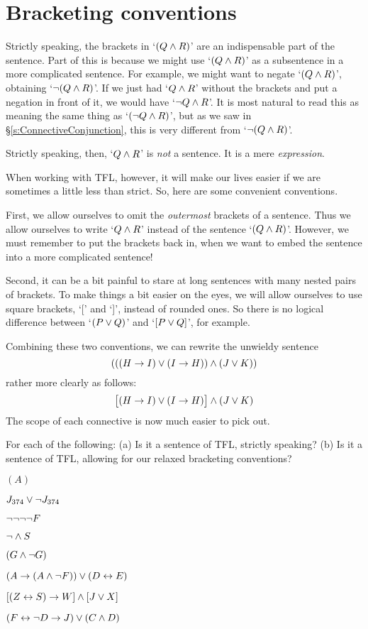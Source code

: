 \section{Bracketing conventions}
\label{TFLconventions}
Strictly speaking, the brackets in `$(Q \wedge R)$' are an indispensable part of the sentence. Part of this is because we might use `$(Q \wedge R)$' as a subsentence in a more complicated sentence. For example, we might want to negate `$(Q \wedge R)$', obtaining `$\neg(Q \wedge R)$'. If we just had `$Q \wedge R$' without the brackets and put a negation in front of it, we would have `$\neg Q \wedge R$'. It is most natural to read this as meaning the same thing as `$(\neg Q \wedge R)$', but as we saw in  \S\ref{s:ConnectiveConjunction}, this is very different from `$\neg(Q\wedge R)$'.

Strictly speaking, then, `$Q \wedge R$' is \emph{not} a sentence. It is a mere \emph{expression}.

When working with TFL, however, it will make our lives easier if we are sometimes a little less than strict. So, here are some convenient conventions.

First,  we allow ourselves to omit the \emph{outermost} brackets of a sentence. Thus we allow ourselves to write `$Q \wedge R$' instead of the sentence `$(Q \wedge R)$'. However, we must remember to put the brackets back in, when we want to embed the sentence into a more complicated sentence!

Second, it can be a bit painful to stare at long sentences with many nested pairs of brackets. To make things a bit easier on the eyes, we will allow ourselves to use square brackets, `[' and `]', instead of rounded ones. So there is no logical difference between `$(P\vee Q)$' and `$[P\vee Q]$', for example.

Combining these two conventions, we can rewrite the unwieldy sentence
$$(((H \rightarrow I) \vee (I \rightarrow H)) \wedge (J \vee K))$$
rather more clearly as follows:
$$\bigl[(H \rightarrow I) \vee (I \rightarrow H)\bigr] \wedge (J \vee K)$$
The scope of each connective is now much easier to pick out.

\practiceproblems

\solutions
\problempart
\label{pr.wiffTFL}
For each of the following: (a) Is it a sentence of TFL, strictly speaking? (b) Is it a sentence of TFL, allowing for our relaxed bracketing conventions?
\begin{earg}
\item $(A)$
\item $J_{374} \vee \neg J_{374}$
\item $\neg \neg \neg \neg F$
\item $\neg \wedge S$
\item $(G \wedge \neg G)$
\item $(A \rightarrow (A \wedge \neg F)) \vee (D \leftrightarrow E)$
\item $[(Z \leftrightarrow S) \rightarrow W] \wedge [J \vee X]$
\item $(F \leftrightarrow \neg D \rightarrow J) \vee (C \wedge D)$
\end{earg}

